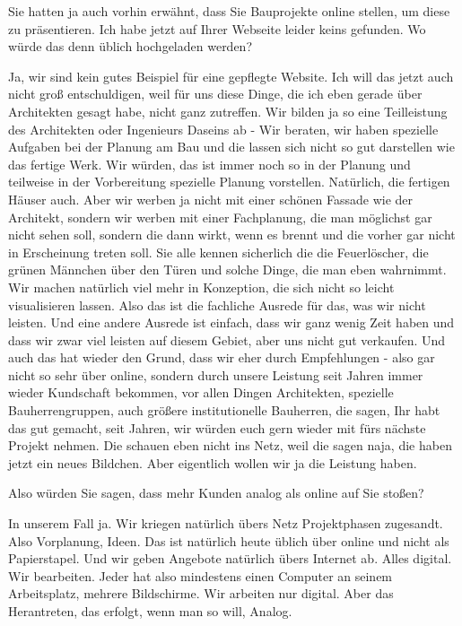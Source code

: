 \begin{description}
\Fabian Sie hatten ja auch vorhin erwähnt, dass Sie Bauprojekte online stellen, um diese zu präsentieren. Ich habe jetzt auf Ihrer Webseite leider keins gefunden. Wo würde das denn üblich hochgeladen werden?

\Andre Ja, wir sind kein gutes Beispiel für eine gepflegte Website. Ich will das jetzt auch nicht groß entschuldigen, weil für uns diese Dinge, die ich eben gerade über Architekten gesagt habe, nicht ganz zutreffen. Wir bilden ja so eine Teilleistung des Architekten oder Ingenieurs Daseins ab - Wir beraten, wir haben spezielle Aufgaben bei der Planung am Bau und die lassen sich nicht so gut darstellen wie das fertige Werk. Wir würden, das ist immer noch so in der Planung und teilweise in der Vorbereitung spezielle Planung vorstellen. Natürlich, die fertigen Häuser auch. Aber wir werben ja nicht mit einer schönen Fassade wie der Architekt, sondern wir werben mit einer Fachplanung, die man möglichst gar nicht sehen soll, sondern die dann wirkt, wenn es brennt und die vorher gar nicht in Erscheinung treten soll. Sie alle kennen sicherlich die die Feuerlöscher, die grünen Männchen über den Türen und solche Dinge, die man eben wahrnimmt. Wir machen natürlich viel mehr in Konzeption, die sich nicht so leicht visualisieren lassen. Also das ist die fachliche Ausrede für das, was wir nicht leisten. Und eine andere Ausrede ist einfach, dass wir ganz wenig Zeit haben und dass wir zwar viel leisten auf diesem Gebiet, aber uns nicht gut verkaufen. Und auch das hat wieder den Grund, dass wir eher durch Empfehlungen - also gar nicht so sehr über online, sondern durch unsere Leistung seit Jahren immer wieder Kundschaft bekommen, vor allen Dingen Architekten, spezielle Bauherrengruppen, auch größere institutionelle Bauherren, die sagen, Ihr habt das gut gemacht, seit Jahren, wir würden euch gern wieder mit fürs nächste Projekt nehmen. Die schauen eben nicht ins Netz, weil die sagen naja, die haben jetzt ein neues Bildchen. Aber eigentlich wollen wir ja die Leistung haben.

\Fabian Also würden Sie sagen, dass mehr Kunden analog als online auf Sie stoßen?

\Andre In unserem Fall ja. Wir kriegen natürlich übers Netz Projektphasen zugesandt. Also Vorplanung, Ideen. Das ist natürlich heute üblich über online und nicht als Papierstapel. Und wir geben Angebote natürlich übers Internet ab. Alles digital. Wir bearbeiten. Jeder hat also mindestens einen Computer an seinem Arbeitsplatz, mehrere Bildschirme. Wir arbeiten nur digital. Aber das Herantreten, das erfolgt, wenn man so will, Analog.


\end{description}
